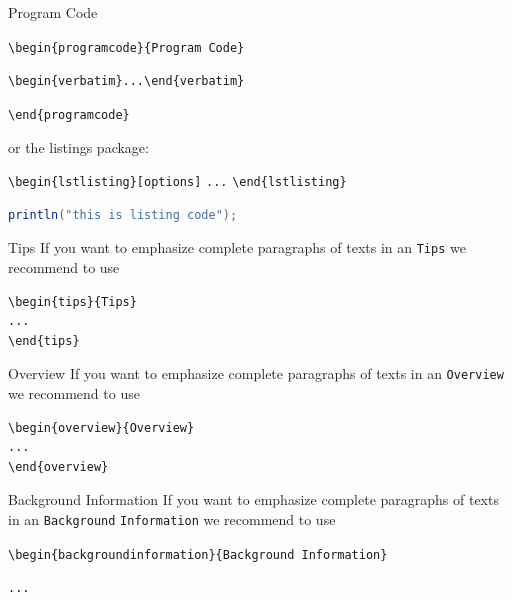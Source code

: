 \begin{bibunit}
\begin{programcode}{Program Code}

\verb|\begin{programcode}{Program Code}|

\verb|\begin{verbatim}...\end{verbatim}|

\verb|\end{programcode}|

or the listings package:

\verb|\begin{lstlisting}[options]|
\verb|...|
\verb|\end{lstlisting}|

\end{programcode}

\begin{lstlisting}[language=Java,frame=single,caption={Sample Java Code},captionpos=b,label={01:listing:1}]
println("this is listing code");
\end{lstlisting}

%
\begin{tips}{Tips}
If you want to emphasize complete paragraphs of texts in an \verb|Tips| we recommend to
use  \begin{verbatim}\begin{tips}{Tips}
...
\end{tips}\end{verbatim}
\end{tips}


\begin{overview}{Overview}
If you want to emphasize complete paragraphs of texts in an \verb|Overview| we recommend to
use  \begin{verbatim}\begin{overview}{Overview}
...
\end{overview}\end{verbatim}
\end{overview}
\begin{backgroundinformation}{Background Information}
If you want to emphasize complete paragraphs of texts in an \verb|Background|
\verb|Information| we recommend to
use

\verb|\begin{backgroundinformation}{Background Information}|

\verb|...|


\end{backgroundinformation}
\end{bibunit}
